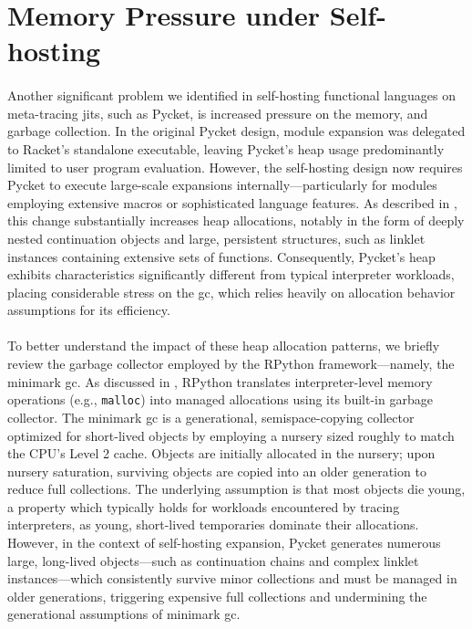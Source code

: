 	\section[\texorpdfstring{Memory Pressure under Self-hosting}{Memory Pressure}]{Memory Pressure under Self-hosting}
	\label{section:memory}

		\paragraph{}%
			Another significant problem we identified in self-hosting functional languages on meta-tracing \glspl{jit}, such as Pycket, is increased pressure on the memory, and garbage collection. In the original Pycket design, module expansion was delegated to Racket's standalone executable, leaving Pycket's heap usage predominantly limited to user program evaluation. However, the self-hosting design now requires Pycket to execute large-scale expansions internally—particularly for modules employing extensive macros or sophisticated language features. As described in , this change substantially increases heap allocations, notably in the form of deeply nested continuation objects and large, persistent structures, such as linklet instances containing extensive sets of functions. Consequently, Pycket's heap exhibits characteristics significantly different from typical interpreter workloads, placing considerable stress on the \gls{gc}, which relies heavily on allocation behavior assumptions for its efficiency.

		\paragraph{}%
			To better understand the impact of these heap allocation patterns, we briefly review the garbage collector employed by the RPython framework—namely, the minimark \gls{gc}. As discussed in , RPython translates interpreter-level memory operations (e.g., \texttt{malloc}) into managed allocations using its built-in garbage collector. The minimark \gls{gc} is a generational, semispace-copying collector optimized for short-lived objects by employing a nursery sized roughly to match the CPU's Level 2 cache. Objects are initially allocated in the nursery; upon nursery saturation, surviving objects are copied into an older generation to reduce full collections. The underlying assumption is that most objects die young, a property which typically holds for workloads encountered by tracing interpreters, as young, short-lived temporaries dominate their allocations. However, in the context of self-hosting expansion, Pycket generates numerous large, long-lived objects—such as continuation chains and complex linklet instances—which consistently survive minor collections and must be managed in older generations, triggering expensive full collections and undermining the generational assumptions of minimark \gls{gc}. \cite{pypy06, bolzPhDThesis, gc:16, LuaJITLanguageToolkit}

